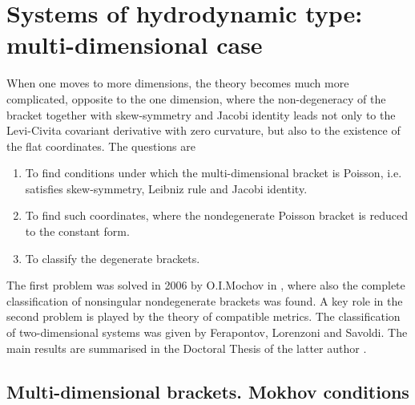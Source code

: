 \chapter{Systems of hydrodynamic type:  multi-dimensional case}

When one moves to more dimensions, the theory becomes much more complicated, opposite to the one dimension, where the non-degeneracy of the bracket together with skew-symmetry and Jacobi identity leads not only to the Levi-Civita covariant derivative with zero curvature, but also to the existence of the flat coordinates.
The questions are
\begin{enumerate}
    \item To find conditions under which the multi-dimensional bracket is Poisson, i.e. satisfies skew-symmetry, Leibniz rule and Jacobi identity.
    \item To find such coordinates, where the nondegenerate Poisson bracket is reduced to the constant form.
    \item To classify the degenerate brackets.
\end{enumerate}

The first problem was solved in 2006 by O.I.Mochov in \cite{Mochov}, where also the complete classification of nonsingular nondegenerate brackets was found. A key role in the second problem is played by the theory of compatible metrics. The classification of two-dimensional systems was given by Ferapontov, Lorenzoni and Savoldi. The main results are summarised in the Doctoral Thesis of the latter author \cite{Savoldi}.

\section{Multi-dimensional brackets. Mokhov conditions}

